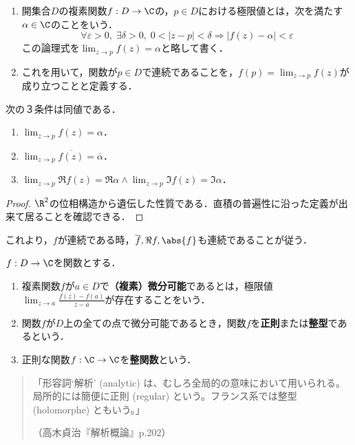 \documentclass[uplatex, dvipdfmx]{jsreport}
\begin{document}
\begin{definition}\mbox{}
    \begin{enumerate}
        \item 開集合$D$の複素関数$f:D\to\C$の，$p\in D$における極限値とは，次を満たす$\alpha\in\C$のことをいう．
        \[ \forall\varepsilon>0,\;\exists\delta>0,\;0<|z-p|<\delta\Rightarrow|f(z)-\alpha|<\varepsilon \]
        この論理式を$\lim_{z\to p}f(z)=\alpha$と略して書く．
        \item これを用いて，関数が$p\in D$で連続であることを，$f(p)=\lim_{z\to p}f(z)$が成り立つことと定義する．
    \end{enumerate}
\end{definition}

\begin{proposition}[連続性の特徴付け]
    次の３条件は同値である．
    \begin{enumerate}
        \item $\lim_{z\to p}f(z)=\alpha$．
        \item $\lim_{z\to p}\overline{f(z)}=\overline{\alpha}$．
        \item $\lim_{z\to p}\Re f(z)=\Re\alpha\land\lim_{z\to p}\Im f(z)=\Im\alpha$．
    \end{enumerate}
\end{proposition}
\begin{proof}
    $\R^2$の位相構造から遺伝した性質である．直積の普遍性に沿った定義が出来て居ることを確認できる．
\end{proof}

\begin{remark}
    これより，$f$が連続である時，$\overline{f},\Re f,\abs{f}$も連続であることが従う．
\end{remark}

\begin{definition}
    $f:D\to\C$を関数とする．
    \begin{enumerate}
        \item 複素関数$f$が$a\in D$で\textbf{（複素）微分可能}であるとは，極限値$\lim_{z\to a}\frac{f(z)-f(a)}{z-a}$が存在することをいう．
        \item 関数$f$が$D$上の全ての点で微分可能であるとき，関数$f$を\textbf{正則}または\textbf{整型}であるという．
        \item 正則な関数$f:\C\to\C$を\textbf{整関数}という．
    \end{enumerate}
    \begin{quotation}
        「形容詞‘解析’ (analytic) は、むしろ全局的の意味において用いられる。局所的には簡便に正則 (regular) という。フランス系では整型 (holomorphe) ともいう。」
        \begin{flushright}
            （高木貞治『解析概論』p.202）
        \end{flushright}
    \end{quotation}
\end{definition}
\end{document}
